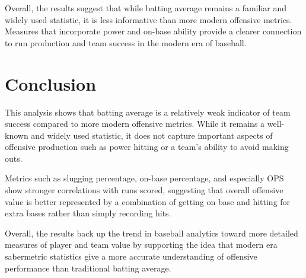 \documentclass{article}
\begin{document}
\vspace{5pt}

Overall, the results suggest that while batting average remains a familiar and widely used statistic, it is less informative than more modern offensive metrics. 
Measures that incorporate power and on-base ability provide a clearer connection to run production and team success in the modern era of baseball.

\vspace{20pt}

\section{Conclusion}

\hspace{12pt} This analysis shows that batting average is a relatively weak indicator of team success compared to more modern offensive metrics. While it remains a 
well-known and widely used statistic, it does not capture important aspects of offensive production such as power hitting or a team's ability to avoid making outs.

\vspace{5pt}

Metrics such as slugging percentage, on-base percentage, and especially OPS show stronger correlations with runs scored, suggesting that overall offensive 
value is better represented by a combination of getting on base and hitting for extra bases rather than simply recording hits.

\vspace{5pt}

Overall, the results back up the trend in baseball analytics toward more detailed measures of player and team value by supporting the idea that modern era 
sabermetric statistics give a more accurate understanding of offensive performance than traditional batting average.
\end{document}
